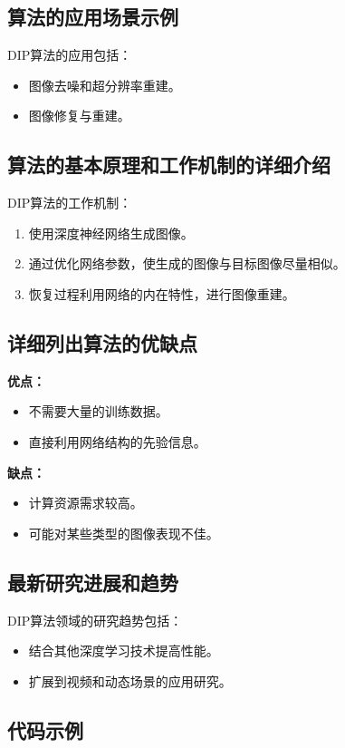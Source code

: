 \subsection*{算法的应用场景示例}
DIP算法的应用包括：
\begin{itemize}
    \item 图像去噪和超分辨率重建。
    \item 图像修复与重建。
\end{itemize}

\subsection*{算法的基本原理和工作机制的详细介绍}
DIP算法的工作机制：
\begin{enumerate}
    \item 使用深度神经网络生成图像。
    \item 通过优化网络参数，使生成的图像与目标图像尽量相似。
    \item 恢复过程利用网络的内在特性，进行图像重建。
\end{enumerate}

\subsection*{详细列出算法的优缺点}
\textbf{优点：}
\begin{itemize}
    \item 不需要大量的训练数据。
    \item 直接利用网络结构的先验信息。
\end{itemize}

\textbf{缺点：}
\begin{itemize}
    \item 计算资源需求较高。
    \item 可能对某些类型的图像表现不佳。
\end{itemize}

\subsection*{最新研究进展和趋势}
DIP算法领域的研究趋势包括：
\begin{itemize}
    \item 结合其他深度学习技术提高性能。
    \item 扩展到视频和动态场景的应用研究。
\end{itemize}
\subsection*{代码示例}
\begin{lstlisting}

\end{lstlisting}


